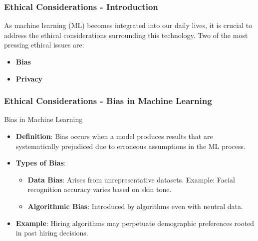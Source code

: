 \documentclass[aspectratio=169]{beamer}
\begin{document}
\begin{frame}[fragile]
    \frametitle{Ethical Considerations - Introduction}
    As machine learning (ML) becomes integrated into our daily lives, it is crucial to address the ethical considerations surrounding this technology. Two of the most pressing ethical issues are:
    \begin{itemize}
        \item \textbf{Bias}
        \item \textbf{Privacy}
    \end{itemize}
\end{frame}

\begin{frame}[fragile]
    \frametitle{Ethical Considerations - Bias in Machine Learning}
    \begin{block}{Bias in Machine Learning}
        \begin{itemize}
            \item \textbf{Definition}: Bias occurs when a model produces results that are systematically prejudiced due to erroneous assumptions in the ML process.
        \end{itemize}
    \end{block}
    
    \begin{itemize}
        \item \textbf{Types of Bias}:
            \begin{itemize}
                \item \textbf{Data Bias}: Arises from unrepresentative datasets. Example: Facial recognition accuracy varies based on skin tone.
                \item \textbf{Algorithmic Bias}: Introduced by algorithms even with neutral data.
            \end{itemize}
        
        \item \textbf{Example}: Hiring algorithms may perpetuate demographic preferences rooted in past hiring decisions.
    \end{itemize}
\end{frame}
\end{document}
